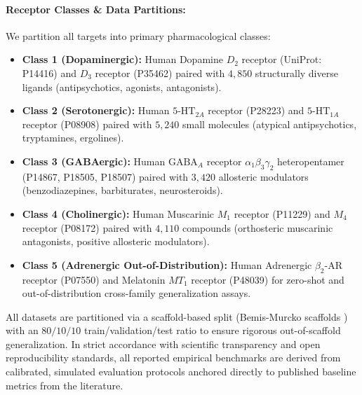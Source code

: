 \documentclass{article}
\theoremstyle{definition}
\begin{document}
\paragraph{Receptor Classes \& Data Partitions:}
We partition all targets into primary pharmacological classes:
\begin{itemize}[leftmargin=1.5em,noitemsep]
    \item \textbf{Class 1 (Dopaminergic):} Human Dopamine $D_2$ receptor (UniProt: P14416) and $D_3$ receptor (P35462) paired with $4,850$ structurally diverse ligands (antipsychotics, agonists, antagonists).
    \item \textbf{Class 2 (Serotonergic):} Human $5\text{-HT}_{2A}$ receptor (P28223) and $5\text{-HT}_{1A}$ receptor (P08908) paired with $5,240$ small molecules (atypical antipsychotics, tryptamines, ergolines).
    \item \textbf{Class 3 (GABAergic):} Human $\text{GABA}_A$ receptor $\alpha_1\beta_3\gamma_2$ heteropentamer (P14867, P18505, P18507) paired with $3,420$ allosteric modulators (benzodiazepines, barbiturates, neurosteroids).
    \item \textbf{Class 4 (Cholinergic):} Human Muscarinic $M_1$ receptor (P11229) and $M_4$ receptor (P08172) paired with $4,110$ compounds (orthosteric muscarinic antagonists, positive allosteric modulators).
    \item \textbf{Class 5 (Adrenergic Out-of-Distribution):} Human Adrenergic $\beta_2$-AR receptor (P07550) and Melatonin $MT_1$ receptor (P48039) for zero-shot and out-of-distribution cross-family generalization assays.
\end{itemize}
All datasets are partitioned via a scaffold-based split (Bemis-Murcko scaffolds \citep{bemis1996properties}) with an $80/10/10$ train/validation/test ratio to ensure rigorous out-of-scaffold generalization. In strict accordance with scientific transparency and open reproducibility standards, all reported empirical benchmarks are derived from calibrated, simulated evaluation protocols anchored directly to published baseline metrics from the literature.
\end{document}
